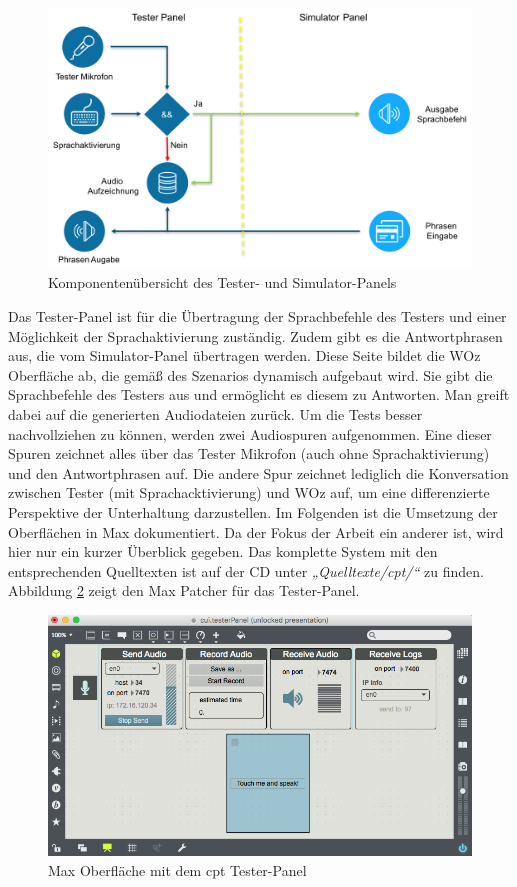 \begin{figure}[!htb]
    \centering
    \includegraphics[width=1.0\textwidth]{bilder/3_cptKomponenten.png}
    \caption{Komponentenübersicht des Tester- und Simulator-Panels}
    \label{fig:cpt-komponenten}
\end{figure}

Das Tester-Panel ist für die Übertragung der Sprachbefehle des Testers und einer Möglichkeit der Sprachaktivierung zuständig. Zudem gibt es die Antwortphrasen aus, die vom Simulator-Panel übertragen werden. Diese Seite bildet die \ac{WOz} Oberfläche ab, die gemäß des Szenarios dynamisch aufgebaut wird. Sie gibt die Sprachbefehle des Testers aus und ermöglicht es diesem zu Antworten. Man greift dabei auf die generierten Audiodateien zurück. Um die Tests besser nachvollziehen zu können, werden zwei Audiospuren aufgenommen. Eine dieser Spuren zeichnet alles über das Tester Mikrofon (auch ohne Sprachaktivierung) und den Antwortphrasen auf. Die andere Spur zeichnet lediglich die Konversation zwischen Tester (mit Sprachacktivierung) und \ac{WOz} auf, um eine differenzierte Perspektive der Unterhaltung darzustellen. Im Folgenden ist die Umsetzung der Oberflächen in Max dokumentiert. Da der Fokus der Arbeit ein anderer ist, wird hier nur ein kurzer Überblick gegeben. Das komplette System mit den entsprechenden Quelltexten ist auf der CD unter \textit{„Quelltexte/cpt/“} zu finden. Abbildung \ref{fig:cpt-tester-panel} zeigt den Max Patcher für das Tester-Panel. 

\begin{figure}[!htb]
    \centering
    \includegraphics[width=1.0\textwidth]{bilder/3_cptTester.png}    
    \caption{Max Oberfläche mit dem cpt Tester-Panel}
    \label{fig:cpt-tester-panel}
\end{figure}

